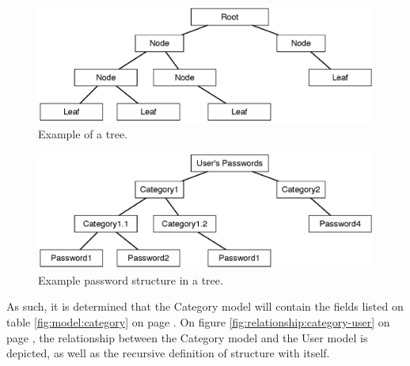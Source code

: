 			\begin{figure}[h!]
				\centering
				\includegraphics[width=\textwidth]{figures/design/uml/generic-tree.eps}
				\caption{Example of a tree.}
				\label{fig:example:tree}
			\end{figure}
		
			\begin{figure}[p]
				\centering
				\includegraphics[width=\textwidth]{figures/design/uml/password-tree.eps}
				\caption{Example password structure in a tree.}
				\label{fig:example:passwordtree}
			\end{figure}

			As such, it is determined that the Category model will contain the fields listed on table \ref{fig:model:category} on page \pageref{fig:model:category}. On figure \ref{fig:relationship:category-user} on page \pageref{fig:relationship:category-user}, the relationship between the Category model and the User model is depicted, as well as the recursive definition of structure with itself.


